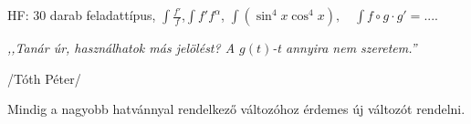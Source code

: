 \documentclass[a4paper,11.5pt]{article}
\begin{document}
	HF: 30 darab feladattípus, $\int\frac{f'}{f}$,\quad  $\int f'f^\alpha$, \quad $\int(\sin^4x\cos^4x),\quad \int f\circ g\cdot g'=...$.
	\begin{center}
		\bigskip
		
		\textit{,,Tanár úr, használhatok más jelölést? A $g(t)$-t annyira nem szeretem.''}
		\smallskip
		
		/Tóth Péter/
		\bigskip
		
	\end{center}
	\begin{note}
		Mindig a nagyobb hatvánnyal rendelkező változóhoz érdemes új változót rendelni.
	\end{note}
\end{document}
